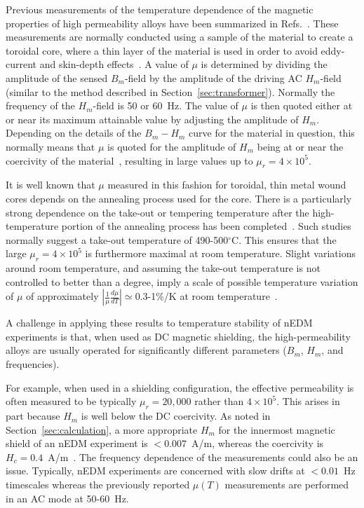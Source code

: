 Previous measurements of the temperature dependence of the magnetic
properties of high permeability alloys have been summarized in
Refs.~\cite{couderchon1982some,bozorth1993ferromagnetism,pfeifer1980soft}. These
measurements are normally conducted using a sample of the material to
create a toroidal core, where a thin layer of the material is used in
order to avoid eddy-current and skin-depth
effects~\cite{pfeifer1980soft,kruppvdm}. A value of $\mu$ is
determined by dividing the amplitude of the sensed $B_m$-field by the
amplitude of the driving AC $H_m$-field (similar to the method
described in Section~\ref{sec:transformer}). Normally the frequency
of the $H_m$-field is 50 or 60~Hz.  The value of $\mu$ is then quoted
either at or near its maximum attainable value by adjusting the
amplitude of $H_m$.  Depending on the details of the $B_m-H_m$ curve
for the material in question, this normally means that $\mu$ is quoted
for the amplitude of $H_m$ being at or near the coercivity of the
material~\cite{couderchon1982some,kruppvdm}, resulting in large values
up to $\mu_r=4\times 10^5$.

It is well known that $\mu$ measured in this fashion for toroidal,
thin metal wound cores depends on the annealing process used for the
core.  There is a particularly strong dependence on the take-out or
tempering temperature after the high-temperature portion of the
annealing process has been
completed~\cite{pfeifer1980soft,kruppvdm,couderchon1982some}. Such
studies normally suggest a take-out temperature of 490-500$^\circ$C.
This ensures that the large $\mu_r=4\times 10^{5}$ is furthermore
maximal at room temperature. Slight variations around room
temperature, and assuming the take-out temperature is not controlled
to better than a degree, imply a scale of possible temperature
variation of $\mu$ of approximately
$\left|\frac{1}{\mu}\frac{d\mu}{dT}\right|\simeq 0.3$-1\%/K at room
temperature~\cite{couderchon1982some,kruppvdm}.

A challenge in applying these results to temperature stability of nEDM
experiments is that, when used as DC magnetic shielding, the
high-permeability alloys are usually operated for significantly
different parameters ($B_m$, $H_m$, and frequencies).

For example, when used in a shielding configuration, the effective
permeability is often measured to be typically $\mu_r=20,000$ rather
than $4\times 10^5$.  This arises in part because $H_m$ is well below
the DC coercivity.  As noted in Section~\ref{sec:calculation}, a more
appropriate $H_m$ for the innermost magnetic shield of an nEDM
experiment is $<0.007$~A/m, whereas the coercivity is
$H_c=0.4$~A/m~\cite{kruppvdm}.  The frequency dependence of the
measurements could also be an issue.  Typically, nEDM experiments are
concerned with slow drifts at $<0.01$~Hz timescales whereas the
previously reported $\mu(T)$ measurements are performed in an AC mode
at 50-60~Hz.


